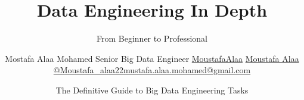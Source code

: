 \title[Data Engineering In Depth] %
{Data Engineering In Depth}

\subtitle{From Beginner to Professional}

\author[Moustafa Alaa] %
{Mostafa Alaa Mohamed \newline Senior Big Data Engineer \newline 
	\faGithub \space \href{https://github.com/moustafaalaa/}{MoustafaAlaa}	
	\faLinkedin \space \href{https://www.linkedin.com/in/moustafa-alaa/}{Moustafa Alaa}
	\faTwitter \space \href{https://twitter.com/moustafa_alaa22}{@Moustafa\_alaa22}\newline	\faEnvelope \space \href{mailto: mustafa.alaa.mohamed@gmail.com}{mustafa.alaa.mohamed@gmail.com} 
}



\date[\today] %
{The Definitive Guide to Big Data Engineering Tasks}



